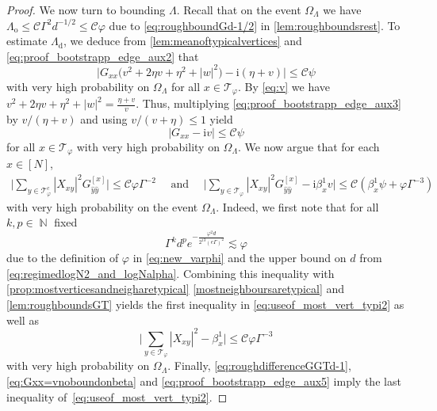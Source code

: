 \documentclass[10pt,a4paper]{amsart}
\DeclareMathOperator{\NN}{\mathbb{N}}
\newcommand{\ii}{\mathrm{i}}
\newcommand{\abs}[1]{\left| #1 \right|}
\numberwithin{equation}{section}
\newcommand*\bset[1]{[#1]}
\newcommand*\ubarr[1]{{\widehat{#1}}}
\begin{document}
\begin{proof}
		We now turn to bounding $\Lambda$. 
		Recall that on the event $\Omega_{\Lambda}$ we have $\Lambda_{\mathrm{o}} \le \mathcal{C} \Gamma^2 d^{-1/2}\le \mathcal C \varphi $ due to \cref{eq:roughboundGd-1/2} in \cref{lem:roughboundsrest}. 
		To estimate $\Lambda_\mathrm{d}$, we deduce from \cref{lem:meanoftypicalvertices} and \eqref{eq:proof_bootstrapp_edge_aux2} that 
		\begin{equation}\label{eq:proof_bootstrapp_edge_aux3} 
			\big|G_{xx} \bigl( v^2  +2 \eta v + \eta^2 + \abs{w}^2 \bigr) -  \ii (\eta + v) \big| \le  \mathcal{C}\psi
		\end{equation}
		with very high probability on $\Omega_\Lambda$ for all $x \in \mathcal{T}_{\varphi}$. 
		By \eqref{eq:v} we have $v^2  +2 \eta v + \eta^2 + \abs{w}^2= \frac{\eta +v}{v}$. 
		Thus, multiplying \eqref{eq:proof_bootstrapp_edge_aux3} by $v/(\eta+ v)$ and using $v/(v+ \eta) \le 1$ yield 
		\begin{equation}\label{eq:Gxx=vnoboundonbeta}
			|G_{xx} - \ii v | \le \mathcal C  \psi
		\end{equation} 
 for all $x \in \mathcal T_\varphi$ with very high probability on $\Omega_{\Lambda}$. We now argue that for each $x \in [N]$, 
		\begin{align}\label{eq:useof_most_vert_typi2}
			\bigg|\sum_{y\in \mathcal{T}_{\varphi}^c} \abs{X_{xy}}^2 G_{\ubarr{y}\ubarr{y}}^{\bset{x}}\bigg| \le  \mathcal{C} \varphi \Gamma^{-2}  \quad \text{ and }\quad \bigg|\sum_{y\in \mathcal{T}_{\varphi}}\abs{X_{xy}}^2 G_{\ubarr{y}\ubarr{y}}^{\bset{x}} -\ii \beta_x^{1}v \bigg| \le  \mathcal{C} ( \beta_x^1 \psi + \varphi \Gamma^{-3}) 
		\end{align}
	with very high probability on the event $\Omega_{\Lambda}$. Indeed, we first note that for all $k,p \in \NN$ fixed 
	\begin{equation}\label{eq:bound_Gamma_non_typic}
	  \Gamma^k  d^p e^{-\frac{\varphi^2d}{2^{13} (e\Gamma)^2}} \lesssim \varphi
	 	\end{equation}
due to the definition of $\varphi$ in \cref{eq:new_varphi} and the upper bound on $d$ from \cref{eq:regimedlogN2_and_logNalpha}. 
		Combining this inequality with 	\cref{prop:mostverticesandneigharetypical} \cref{mostneighboursaretypical} and \cref{lem:roughboundsGT}
		yields the first inequality in \eqref{eq:useof_most_vert_typi2} as well as 
		\begin{equation} \label{eq:proof_bootstrapp_edge_aux5} 
			\bigg|\sum_{y\in \mathcal{T}_{\varphi}} \abs{X_{xy}}^2 - \beta_{x}^1 \bigg|\le  \mathcal{C} \varphi  \Gamma^{-3} 
		\end{equation} 
		with very high probability on $\Omega_\Lambda$. 
		Finally, \eqref{eq:roughdifferenceGGTd-1}, \eqref{eq:Gxx=vnoboundonbeta} and \eqref{eq:proof_bootstrapp_edge_aux5}  imply the last inequality of~\eqref{eq:useof_most_vert_typi2}.  
		

\end{proof}
\end{document}
